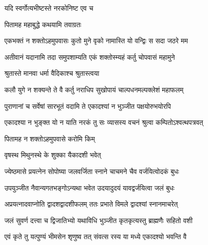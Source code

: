 
\onelineshloka
{यदि स्वर्गोत्यभीष्टस्ते नरकोनिष्ट एव च} %



\onelineshloka
{पितामह महाबुद्धे कथयामि तवाग्रतः} %

\twolineshloka
{एकभक्तं न शक्तोऽहमुपवासः कुतो मुने}
{वृको नामास्ति यो वन्द्विः स सदा जठरे मम} %

\twolineshloka
{अतीवानं यदानामि तदा समुपशाम्यति}
{एकं शक्तोस्म्यहं कर्तु चोपवासं महामुने} %



\onelineshloka
{श्रुतास्ते मानवा धर्मा वैदिकाश्च श्रुतास्त्वया} %

\twolineshloka
{कलौ युगे न शक्यन्ते ते वै कर्तु नराधिप}
{सुखोपायं चाल्पधनमल्पक्लेशं महाफलम्} %

\twolineshloka
{पुराणानां च सर्वेषां सारभूतं वदामि ते}
{एकादश्यां न भुञ्जीत पक्षयोरुभयोरपि} %

\twolineshloka
{एकादश्या न भुङ्क्त यो न याति नरकं तु सः}
{व्यासस्य वचनं श्रुत्वा कम्पितोऽश्वत्थपत्रवत्} %



\onelineshloka
{पितामह न शक्तोऽहमुपवासे करोमि किम्} %



\onelineshloka
{वृषस्थ मिथुनस्थे के शुक्का यैकादशी भवेत्} %

\twolineshloka
{ज्येष्ठमासे प्रयत्नेन सोपोष्या जलवर्जिता}
{स्नाने चाचमने चैव वर्जयित्वोदकं बुधः} %

\twolineshloka
{उपयुञ्जीत नैवान्यगतभङ्गोऽन्यथा भवेत}
{उदयादुदयं यावद्वर्जयित्वा जलं बुधः} %

\twolineshloka
{अप्रयत्नादवाप्नोति द्वादशद्वादशीफलम्}
{ततः प्रभाते विमले द्वादश्यां स्नानमाचरेत्} %

\twolineshloka
{जलं सुवर्ण दत्त्वा च द्विजातिभ्यो यथाविधि}
{भुञ्जीत कृतकृत्यस्तु ब्राह्मणैः सहितो वशी} %

\twolineshloka
{एवं कृते तु यत्पुण्यं भीमसेन शृणुष्व तत्}
{संवत्स रस्य या मध्ये एकादश्यो भवन्ति वै} %

